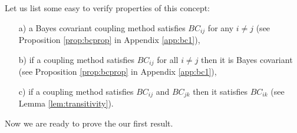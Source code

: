 Let us list some easy to verify properties of this concept:

\begin{itemize}
	\item[a)] a Bayes covariant coupling method satisfies $BC_{ij}$ for any $i\not= j$ (see Proposition \ref{prop:bcprop} in Appendix \ref{app:bc1}),
	\item[b)] if a coupling method satisfies $BC_{ij}$ for all $i\not= j$ then it is Bayes covariant (see Proposition \ref{prop:bcprop} in Appendix \ref{app:bc1}),
	\item[c)] if a coupling method satisfies $BC_{ij}$ and $BC_{jk}$ then it satisfies $BC_{ik}$ (see Lemma \ref{lem:transitivity}).
\end{itemize}

Now we are ready to prove the our first result.

